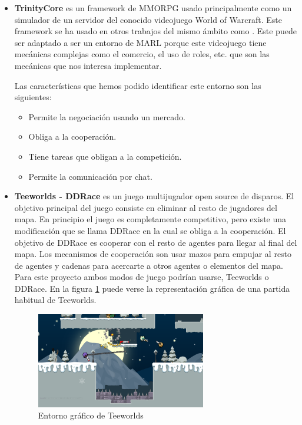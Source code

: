 \begin{itemize}
	\item \textbf{TrinityCore} \cite{trinity-repo} es un framework de MMORPG usado principalmente como un simulador de un servidor del conocido videojuego World of Warcraft. Este framework se ha usado en otros trabajos del mismo ámbito como \cite {wow-upc}. Este puede ser adaptado a ser un entorno de MARL porque este videojuego tiene mecánicas complejas como el comercio, el uso de roles, etc. que son las mecánicas que nos interesa implementar.

	      Las características que hemos podido identificar este entorno son las siguientes:
	      \begin{itemize}
		      \item Permite la negociación usando un mercado.
		      \item Obliga a la cooperación.
		      \item Tiene tareas que obligan a la competición.
		      \item Permite la comunicación por chat.
	      \end{itemize}

	\item \textbf{Teeworlds - DDRace} \cite{teeworlds} es un juego multijugador open source de disparos. El objetivo principal del juego consiste en eliminar al resto de jugadores del mapa. En principio el juego es completamente competitivo, pero existe una modificación que se llama DDRace en la cual se obliga a la cooperación. El objetivo de DDRace es cooperar con el resto de agentes para llegar al final del mapa. Los mecanismos de cooperación son usar mazos para empujar al resto de agentes y cadenas para acercarte a otros agentes o elementos del mapa. Para este proyecto ambos modos de juego podrían usarse, Teeworlds o DDRace. En la figura \ref{fig:teeworlds} puede verse la representación gráfica de una partida habitual de Teeworlds.

	      \begin{figure}[ht]
		      \centering
		      \includegraphics[width=0.7\textwidth]{img/screenshot_winter (1).png}
		      \caption{Entorno gráfico de Teeworlds \cite{teeworlds}}
		      \label{fig:teeworlds}
	      \end{figure}


\end{itemize}
